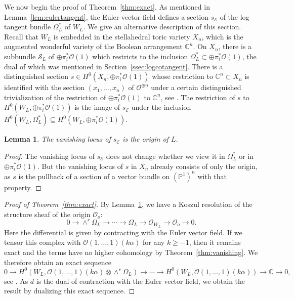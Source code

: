 \documentclass{amsart}
\newtheorem{lemma}[theorem]{Lemma}
\theoremstyle{definition}
\begin{document}
We now begin the proof of Theorem~\ref{thm:exact}. As mentioned in Lemma~\ref{lem:eulertangent}, the Euler vector field defines a section $s_{\mathcal{E}}$ of the log tangent bundle $\Omega_L^*$ of $W_L$. We give an alternative description of this section. Recall that $W_L$ is embedded in the stellahedral toric variety $X_n$, which is the augmented wonderful variety of the Boolean arrangement $\mathbb{C}^n$. On $X_n$, there is a subbundle $\mathcal{S}_L$ of $\oplus \pi_i^* \mathcal{O}(1)$ which restricts to the inclusion $\Omega_L^* \subset \oplus \pi_i^* \mathcal{O}(1)$, the dual of which was mentioned in Section~\ref{ssec:logcotangent}. There is a distinguished section $s \in H^0(X_n, \oplus \pi_i^* \mathcal{O}(1))$ whose restriction to $\mathbb{C}^n \subset X_n$ is identified with the section $(x_1, \dotsc, x_n)$ of $\mathcal{O}^{\oplus n}$ under a certain distinguished trivialization of the restriction of $\oplus \pi_i^* \mathcal{O}(1)$ to $\mathbb{C}^n$, see \cite[Section 5]{EHL}. The restriction of $s$ to $H^0(W_L, \oplus \pi_i^* \mathcal{O}(1))$ is the image of $s_{\mathcal{E}}$ under the inclusion $H^0(W_L, \Omega_L^*) \subseteq H^0(W_L, \oplus \pi_i^* \mathcal{O}(1))$. 

\begin{lemma}\label{lem:eulervanish}
The vanishing locus of $s_{\mathcal{E}}$ is the origin of $L$.
\end{lemma}

\begin{proof}
The vanishing locus of $s_{\mathcal{E}}$ does not change whether we view it in $\Omega_L^*$ or in $\oplus \pi_i^* \mathcal{O}(1)$. But the vanishing locus of $s$ in $X_n$ already consists of only the origin, as $s$ is the pullback of a section of a vector bundle on $(\mathbb{P}^1)^n$ with that property. 
\end{proof}

\begin{proof}[Proof of Theorem~\ref{thm:exact}]
By Lemma~\ref{lem:eulervanish}, we have a Koszul resolution of the structure sheaf of the origin $\mathcal{O}_o$:
$$0 \to \wedge^r \Omega_L \to \dotsb \to \Omega_L \to \mathcal{O}_{W_L} \to \mathcal{O}_o \to 0.$$
Here the differential is given by contracting with the Euler vector field. If we tensor this complex with $\mathcal{O}(1, \dotsc, 1)(k\alpha)$ for any $k \ge -1$, then it remains exact and the terms have no higher cohomology by Theorem~\ref{thm:vanishing}. We therefore obtain an exact sequence
$$0 \to H^0(W_L, \mathcal{O}(1, \dotsc, 1)(k\alpha) \otimes \wedge^r \Omega_L) \to \dotsb  \to H^0(W_L, \mathcal{O}(1, \dotsc, 1)(k\alpha)) \to \mathbb{C} \to 0,$$
see \cite[Proposition B.1.1]{Lazarsfeld1}. As $d$ is the dual of contraction with the Euler vector field, we obtain the result by dualizing this exact sequence. 
\end{proof}
\end{document}

